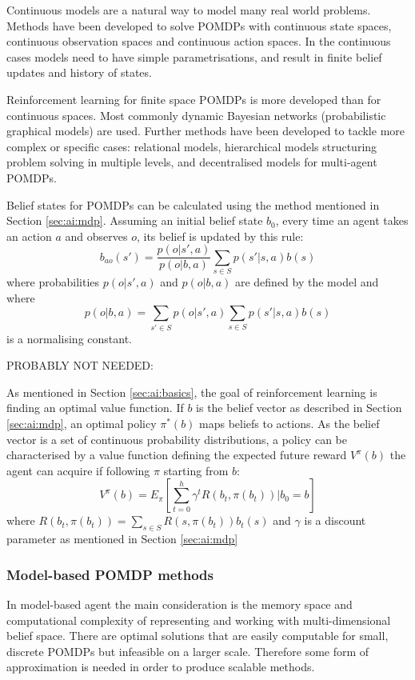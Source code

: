 Continuous models are a natural way to model many real world problems. Methods
have been developed to solve POMDPs with continuous state spaces, continuous
observation spaces and continuous action spaces. In the continuous cases models
need to have simple parametrisations, and result in finite belief updates and
history of states. \parencite{Spaan2012ai+pomdp}

Reinforcement learning for finite space POMDPs is more developed than for
continuous spaces. Most commonly dynamic Bayesian networks (probabilistic
graphical models) are used. Further methods have been developed to tackle more
complex or specific cases: relational models, hierarchical models structuring
problem solving in multiple levels, and decentralised models for multi-agent
POMDPs. \parencite{Spaan2012ai+pomdp}

Belief states for POMDPs can be calculated using the method mentioned in
Section \ref{sec:ai:mdp}. Assuming an initial belief state \(b_0\), every time
an agent takes an action \(a\) and observes \(o\), its belief is updated by
this rule: \[ b_{ao}(s') = \frac{ p(o|s',a) }{ p(o|b,a) } \sum_{s \in S}
p(s'|s,a) b(s) \] where probabilities \(p(o|s',a)\) and \(p(o|b,a)\) are
defined by the model and where \[p(o|b,a) = \sum_{s' \in S} p(o|s',a) \sum_{s
\in S} p(s'|s,a) b(s) \] is a normalising constant.
\parencite{Spaan2012ai+pomdp}


PROBABLY NOT NEEDED:

As mentioned in Section \ref{sec:ai:basics}, the goal of reinforcement learning
is finding an optimal value function. If \(b\) is the belief vector as
described in Section \ref{sec:ai:mdp}, an optimal policy \(\pi^*(b)\) maps
beliefs to actions. As the belief vector is a set of continuous probability
distributions, a policy can be characterised by a value function defining the
expected future reward \(V^{\pi}(b)\) the agent can acquire if following
\(\pi\) starting from \(b\):
\[ V^{\pi}(b) = 
E_{\pi} \left [ \sum_{t=0}^h \gamma^t R(b_t, \pi(b_t)) | b_0 = b \right ] \]
where \( R(b_t, \pi (b_t)) = \sum_{s \in S} R(s, \pi (b_t)) b_t(s) \) and 
\(\gamma\) is a discount parameter as mentioned in Section \ref{sec:ai:mdp}


\subsubsection{Model-based POMDP methods}
\label{sec:ai:model:based}

In model-based agent the main consideration is the memory space and
computational complexity of representing and working with multi-dimensional
belief space. There are optimal solutions that are easily computable for small,
discrete POMDPs but infeasible on a larger scale. Therefore some form of
approximation is needed in order to produce scalable methods.
\parencite{Spaan2012ai+pomdp}

